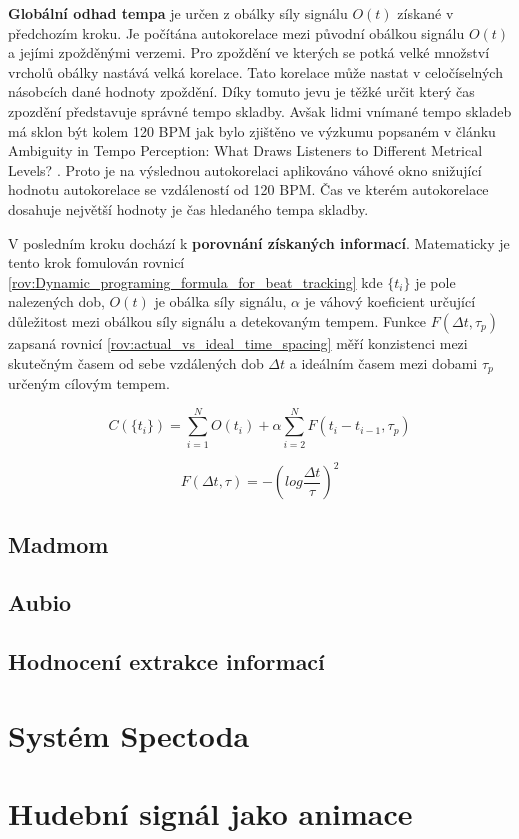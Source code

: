     \textbf{Globální odhad tempa} je určen z obálky síly signálu $O(t)$ získané v předchozím kroku. Je počítána autokorelace mezi původní obálkou signálu $O(t)$ a jejími zpožděnými verzemi. Pro zpoždění ve kterých se potká velké množství vrcholů obálky nastává velká korelace. Tato korelace může nastat v celočíselných násobcích dané hodnoty zpoždění. Díky tomuto jevu je těžké určit který čas zpozdění představuje správné tempo skladby. Avšak lidmi vnímané tempo skladeb má sklon být kolem 120 \acs{BPM} jak bylo zjištěno ve výzkumu popsaném v článku Ambiguity in Tempo Perception: What Draws Listeners to Different Metrical Levels? \cite{Ambiguity_in_tempo_perception}. Proto je na výslednou autokorelaci aplikováno váhové okno snižující hodnotu autokorelace se vzdáleností od 120 BPM. Čas ve kterém autokorelace dosahuje největší hodnoty je čas hledaného tempa skladby.  

    V posledním kroku dochází k \textbf{porovnání získaných informací}. Matematicky je tento krok fomulován rovnicí \ref{rov:Dynamic_programing_formula_for_beat_tracking} kde $ \{t_i\} $ je pole nalezených dob, $O(t)$ je obálka síly signálu, $\alpha$ je váhový koeficient určující důležitost mezi obálkou síly signálu a detekovaným tempem. Funkce $F(\Delta t, \tau_p)$ zapsaná rovnicí \ref{rov:actual_vs_ideal_time_spacing} měří konzistenci mezi skutečným časem od sebe vzdálených dob $\Delta t$ a ideálním časem mezi dobami $ \tau_p$ určeným cílovým tempem.

    \begin{equation}
      C(\{t_i\}) = \sum_{i = 1}^{N} O(t_i) + \alpha \sum_{i = 2}^{N} F(t_i - t_{i-1}, \tau_p)
      \label{rov:Dynamic_programing_formula_for_beat_tracking}
    \end{equation}

    \begin{equation}
      F(\Delta t, \tau) = -(log \frac{\Delta t}{\tau})^2
      \label{rov:actual_vs_ideal_time_spacing}
    \end{equation}


\subsection{Madmom}
\subsection{Aubio}
\subsection{Hodnocení extrakce informací}

\section{Systém Spectoda} \label{sec:Spectoda}

\section{Hudební signál jako animace}